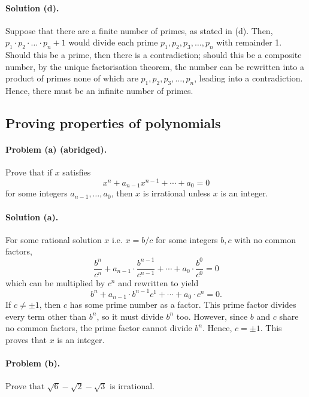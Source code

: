 \documentclass{article}
\begin{document}
\paragraph{Solution (d).} Suppose that there are a finite number of primes, as stated in (d). Then, $p_1 \cdot p_2 \cdot \ldots \cdot p_n + 1$ would divide each prime $p_1, p_2, p_3, \ldots, p_n$ with remainder 1. Should this be a prime, then there is a contradiction; should this be a composite number, by the unique factorisation theorem, the number can be rewritten into a product of primes none of which are $p_1, p_2, p_3, \ldots, p_n$, leading into a contradiction. Hence, there must be an infinite number of primes.

\setcounter{subsection}{17}
\subsection{Proving properties of polynomials}

\paragraph{Problem (a) (abridged).} Prove that if $x$ satisfies \begin{equation*}
  x^n + a_{n-1}x^{n-1} + \cdots + a_0 = 0
\end{equation*} for some integers $a_{n-1}, \ldots, a_0$, then $x$ is irrational unless $x$ is an integer.

\paragraph{Solution (a).} For some rational solution $x$ i.e. $x = b/c$ for some integers $b, c$ with no common factors, \begin{equation*}
  \frac{b^n}{c^n} + a_{n-1} \cdot \frac{b^{n-1}}{c^{n-1}} + \cdots + a_0 \cdot \frac{b^0}{c^0} = 0
\end{equation*} which can be multiplied by $c^n$ and rewritten to yield \begin{equation*}
  b^n + a_{n-1} \cdot b^{n-1}c^1 + \cdots + a_0 \cdot c^n = 0.
\end{equation*} If $c \neq \pm1$, then $c$ has some prime number as a factor. This prime factor divides every term other than $b^n$, so it must divide $b^n$ too. However, since $b$ and $c$ share no common factors, the prime factor cannot divide $b^n$. Hence, $c = \pm1$. This proves that $x$ is an integer.

\paragraph{Problem (b).} Prove that $\sqrt{6} - \sqrt{2} - \sqrt{3}$ is irrational.
\end{document}
